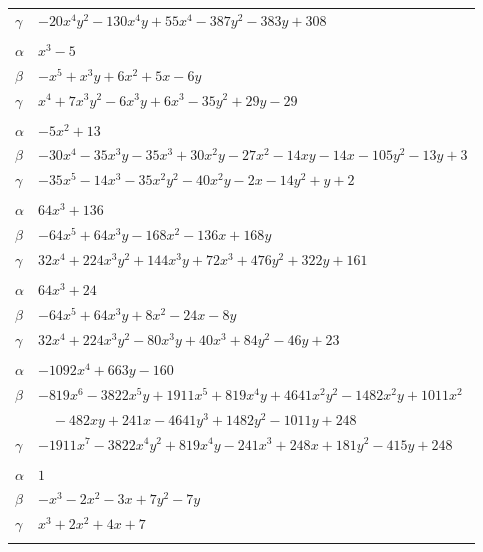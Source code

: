 \documentclass[11pt]{article}
\begin{document}
\begin{longtable}{@{}ll@{}}
$\gamma$ & $-20x^{4}y^{2}-130x^{4}y+55x^{4}-387y^{2}-383y+308$\\
\addlinespace[3pt]
\multicolumn{2}{@{}l}{$\{i,j\}=\{2,3\}$, $k_{ij}=2^{3}\cdot 3$}\\
$\alpha$ & $x^{3}-5$\\
$\beta$ & $-x^{5}+x^{3}y+6x^{2}+5x-6y$\\
$\gamma$ & $x^{4}+7x^{3}y^{2}-6x^{3}y+6x^{3}-35y^{2}+29y-29$\\
\addlinespace[3pt]
\multicolumn{2}{@{}l}{$\{i,j\}=\{2,7\}$, $k_{ij}=11$}\\
$\alpha$ & $-5x^{2}+13$\\
$\beta$ & $-30x^{4}-35x^{3}y-35x^{3}+30x^{2}y-27x^{2}-14xy-14x-105y^{2}-13y+3$\\
$\gamma$ & $-35x^{5}-14x^{3}-35x^{2}y^{2}-40x^{2}y-2x-14y^{2}+y+2$\\
\addlinespace[3pt]
\multicolumn{2}{@{}l}{$\{i,j\}=\{2,8\}$, $k_{ij}=3^{3}\cdot 11$}\\
$\alpha$ & $64x^{3}+136$\\
$\beta$ & $-64x^{5}+64x^{3}y-168x^{2}-136x+168y$\\
$\gamma$ & $32x^{4}+224x^{3}y^{2}+144x^{3}y+72x^{3}+476y^{2}+322y+161$\\
\addlinespace[3pt]
\multicolumn{2}{@{}l}{$\{i,j\}=\{2,9\}$, $k_{ij}=1$}\\
$\alpha$ & $64x^{3}+24$\\
$\beta$ & $-64x^{5}+64x^{3}y+8x^{2}-24x-8y$\\
$\gamma$ & $32x^{4}+224x^{3}y^{2}-80x^{3}y+40x^{3}+84y^{2}-46y+23$\\
\addlinespace[3pt]
\multicolumn{2}{@{}l}{$\{i,j\}=\{2,14\}$, $k_{ij}=2^{3}\cdot 11$}\\
$\alpha$ & $-1092x^{4}+663y-160$\\
$\beta$ & $-819x^{6}-3822x^{5}y+1911x^{5}+819x^{4}y+4641x^{2}y^{2}-1482x^{2}y+1011x^{2}$\\
 & $\quad -482xy+241x-4641y^{3}+1482y^{2}-1011y+248$\\
$\gamma$ & $-1911x^{7}-3822x^{4}y^{2}+819x^{4}y-241x^{3}+248x+181y^{2}-415y+248$\\
\addlinespace[3pt]
\multicolumn{2}{@{}l}{$\{i,j\}=\{3,6\}$, $k_{ij}=2^{3}$}\\
$\alpha$ & $1$\\
$\beta$ & $-x^{3}-2x^{2}-3x+7y^{2}-7y$\\
$\gamma$ & $x^{3}+2x^{2}+4x+7$\\
\addlinespace[3pt]
\multicolumn{2}{@{}l}{$\{i,j\}=\{3,10\}$, $k_{ij}=2^{4}$}\\

\end{longtable}
\end{document}
